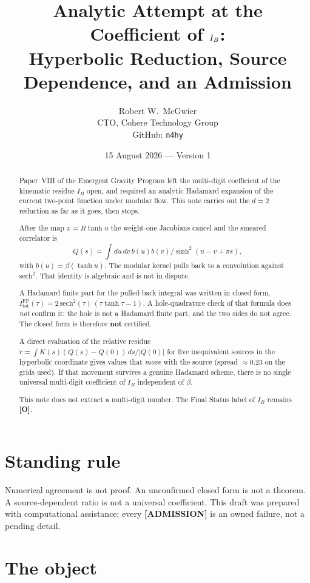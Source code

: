 \documentclass[11pt]{article}
\title{\textbf{Analytic Attempt at the Coefficient of $\IB$:\\
Hyperbolic Reduction, Source Dependence, and an Admission}}
\author{Robert W.\ McGwier\\
\small CTO, Cohere Technology Group\\
\small GitHub: \texttt{n4hy}}
\date{15 August 2026 --- Version 1}
\theoremstyle{definition}
\newcommand{\pO}{\textbf{[O]}}
\newcommand{\pA}{\textbf{[ADMISSION]}}
\newcommand{\IB}{I_B}
\begin{document}
\maketitle

\begin{abstract}
\noindent
Paper~VIII of the Emergent Gravity Program left the multi-digit
coefficient of the kinematic residue $\IB$ open, and required an
analytic Hadamard expansion of the current two-point function under
modular flow. This note carries out the $d=2$ reduction as far as it
goes, then stops.

After the map $x=R\tanh u$ the weight-one Jacobians cancel and the
smeared correlator is
\begin{equation*}
Q(s)=\int\!du\,dv\,b(u)b(v)/\sinh^{2}(u-v+\pi s),
\end{equation*}
with $b(u)=\beta(\tanh u)$. The modular kernel pulls back to a
convolution against $\mathrm{sech}^{2}$. That identity is algebraic
and is not in dispute.

A Hadamard finite part for the pulled-back integral was written in
closed form,
$I_{\mathrm{tot}}^{\mathrm{FP}}(\tau)=2\,\mathrm{sech}^{2}(\tau)\,(\tau\tanh\tau-1)$.
A hole-quadrature check of that formula does \emph{not} confirm it:
the hole is not a Hadamard finite part, and the two sides do not
agree. The closed form is therefore \textbf{not} certified.

A direct evaluation of the relative residue
$r=\int K(s)(Q(s)-Q(0))\,ds/|Q(0)|$
for five inequivalent sources in the hyperbolic coordinate gives
values that \emph{move} with the source (spread $\approx 0.23$ on the
grids used). If that movement survives a genuine Hadamard scheme, there
is no single universal multi-digit coefficient of $\IB$ independent of
$\beta$.

This note does not extract a multi-digit number. The Final Status
label of $\IB$ remains \pO{}.
\end{abstract}

\section*{Standing rule}
Numerical agreement is not proof. An unconfirmed closed form is not a
theorem. A source-dependent ratio is not a universal coefficient.
This draft was prepared with computational assistance; every
\pA{} is an owned failure, not a pending detail.

\section{The object}
\end{document}
